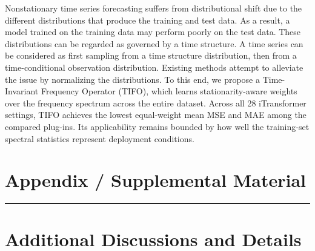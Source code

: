 \documentclass[sigconf,anonymous,review]{acmart}
\newcommand{\resubmitchange}[1]{#1}
\newcommand{\methodn}{\textsc{TIFO}}
\newcommand{\method}{\textsc{\methodn}\xspace}
\newcommand\DoToC{%
  \startcontents
  \printcontents{}{1}{\textbf{Contents}\vskip3pt\hrule\vskip5pt}
  \vskip3pt\hrule\vskip5pt
}
\begin{document}
Nonstationary time series forecasting suffers from distributional shift due to the different distributions that produce the training and test data.
As a result, a model trained on the training data may perform poorly on the test data.
These distributions can be regarded as governed by a time structure.
A time series can be considered as first sampling from a time structure distribution, then from a time-conditional observation distribution.
Existing methods attempt to alleviate the issue by normalizing the distributions.
To this end, we propose a Time-Invariant Frequency Operator (\method), which learns stationarity-aware weights over the frequency spectrum across the entire dataset.
\resubmitchange{Across all 28 iTransformer settings, TIFO achieves the lowest equal-weight mean MSE and MAE among the compared plug-ins. Its applicability remains bounded by how well the training-set spectral statistics represent deployment conditions.}





\newpage
\appendix

\section*{Appendix / Supplemental Material}

\DoToC 




\section{Additional Discussions and Details}
\end{document}
